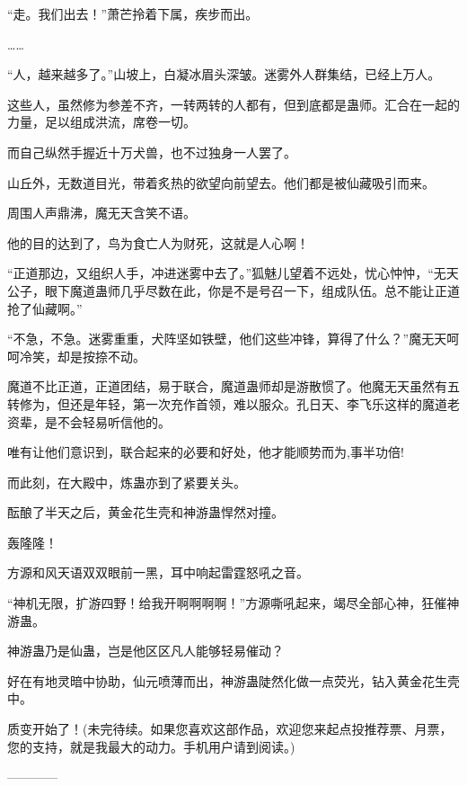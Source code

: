 \begin{this_body}
“走。我们出去！”萧芒拎着下属，疾步而出。

……

“人，越来越多了。”山坡上，白凝冰眉头深皱。迷雾外人群集结，已经上万人。

这些人，虽然修为参差不齐，一转两转的人都有，但到底都是蛊师。汇合在一起的力量，足以组成洪流，席卷一切。

而自己纵然手握近十万犬兽，也不过独身一人罢了。

山丘外，无数道目光，带着炙热的欲望向前望去。他们都是被仙藏吸引而来。

周围人声鼎沸，魔无天含笑不语。

他的目的达到了，鸟为食亡人为财死，这就是人心啊！

“正道那边，又组织人手，冲进迷雾中去了。”狐魅儿望着不远处，忧心忡忡，“无天公子，眼下魔道蛊师几乎尽数在此，你是不是号召一下，组成队伍。总不能让正道抢了仙藏啊。”

“不急，不急。迷雾重重，犬阵坚如铁壁，他们这些冲锋，算得了什么？”魔无天呵呵冷笑，却是按捺不动。

魔道不比正道，正道团结，易于联合，魔道蛊师却是游散惯了。他魔无天虽然有五转修为，但还是年轻，第一次充作首领，难以服众。孔日天、李飞乐这样的魔道老资辈，是不会轻易听信他的。

唯有让他们意识到，联合起来的必要和好处，他才能顺势而为,事半功倍!

而此刻，在大殿中，炼蛊亦到了紧要关头。

酝酿了半天之后，黄金花生壳和神游蛊悍然对撞。

轰隆隆！

方源和风天语双双眼前一黑，耳中响起雷霆怒吼之音。

“神机无限，扩游四野！给我开啊啊啊啊！”方源嘶吼起来，竭尽全部心神，狂催神游蛊。

神游蛊乃是仙蛊，岂是他区区凡人能够轻易催动？

好在有地灵暗中协助，仙元喷薄而出，神游蛊陡然化做一点荧光，钻入黄金花生壳中。

质变开始了！(未完待续。如果您喜欢这部作品，欢迎您来起点投推荐票、月票，您的支持，就是我最大的动力。手机用户请到阅读。)

------------

\end{this_body}

